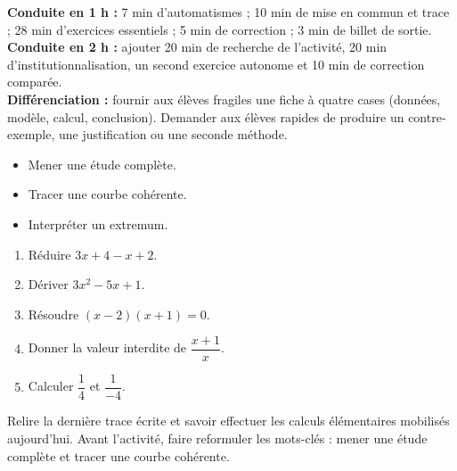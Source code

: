 \ifmxteacher
\begin{method}
\textbf{Conduite en 1 h :} 7 min d'automatismes ; 10 min de mise en commun et trace ; 28 min d'exercices essentiels ; 5 min de correction ; 3 min de billet de sortie.\\
\textbf{Conduite en 2 h :} ajouter 20 min de recherche de l'activité, 20 min d'institutionnalisation, un second exercice autonome et 10 min de correction comparée.\\
\textbf{Différenciation :} fournir aux élèves fragiles une fiche à quatre cases (données, modèle, calcul, conclusion). Demander aux élèves rapides de produire un contre-exemple, une justification ou une seconde méthode.
\end{method}
\fi
{}
\begin{objectives}\begin{itemize}\item Mener une étude complète.\item Tracer une courbe cohérente.\item Interpréter un extremum.\end{itemize}\end{objectives}
\begin{fluency}\begin{enumerate}\item Réduire $3x+4-x+2$. \item Dériver $3x^2-5x+1$. \item Résoudre $(x-2)(x+1)=0$. \item Donner la valeur interdite de $\dfrac{x+1}{x}$. \item Calculer $\dfrac1{4}$ et $\dfrac1{-4}$. \end{enumerate}\end{fluency}
\begin{prerequisites}Relire la dernière trace écrite et savoir effectuer les calculs élémentaires mobilisés aujourd'hui. Avant l'activité, faire reformuler les mots-clés : mener une étude complète et tracer une courbe cohérente.\end{prerequisites}

